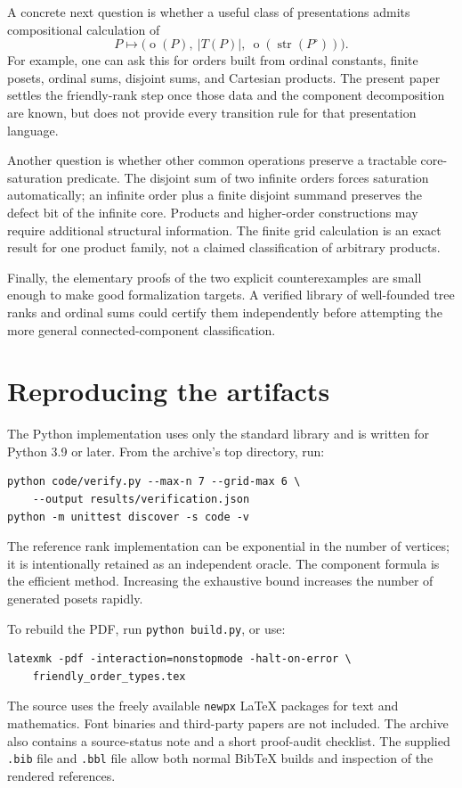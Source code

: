 \documentclass[11pt,a4paper]{article}
\theoremstyle{definition}
\theoremstyle{remark}
\DeclareMathOperator{\mot}{o}
\DeclareMathOperator{\str}{str}
\newcommand{\core}[1]{{#1}^{\circ}}
\begin{document}
A concrete next question is whether a useful class of presentations admits
compositional calculation of
\[
P\longmapsto\bigl(\mot(P),\ |T(P)|,\
                  \mot(\str(\core{P}))\bigr).
\]
For example, one can ask this for orders built from ordinal constants,
finite posets, ordinal sums, disjoint sums, and Cartesian products. The
present paper settles the friendly-rank step once those data and the
component decomposition are known, but does not provide every transition
rule for that presentation language.

Another question is whether other common operations preserve a tractable
core-saturation predicate. The disjoint sum of two infinite orders forces
saturation automatically; an infinite order plus a finite disjoint summand
preserves the defect bit of the infinite core. Products and higher-order
constructions may require additional structural information. The finite
grid calculation is an exact result for one product family, not a claimed
classification of arbitrary products.

Finally, the elementary proofs of the two explicit counterexamples are
small enough to make good formalization targets. A verified library of
well-founded tree ranks and ordinal sums could certify them independently
before attempting the more general connected-component classification.

\appendix
\section{Reproducing the artifacts}\label{sec:reproduce}

The Python implementation uses only the standard library and is written
for Python 3.9 or later. From the archive's top directory, run:
\begin{lstlisting}
python code/verify.py --max-n 7 --grid-max 6 \
    --output results/verification.json
python -m unittest discover -s code -v
\end{lstlisting}
The reference rank implementation can be exponential in the number of
vertices; it is intentionally retained as an independent oracle. The
component formula is the efficient method. Increasing the exhaustive
bound increases the number of generated posets rapidly.

To rebuild the PDF, run \texttt{python build.py}, or use:
\begin{lstlisting}
latexmk -pdf -interaction=nonstopmode -halt-on-error \
    friendly_order_types.tex
\end{lstlisting}
The source uses the freely available \texttt{newpx} LaTeX packages for text
and mathematics. Font binaries and third-party papers are not included.
The archive also contains a source-status note and a short proof-audit
checklist. The supplied \texttt{.bib} file and \texttt{.bbl} file allow both
normal BibTeX builds and inspection of the rendered references.



\end{document}
